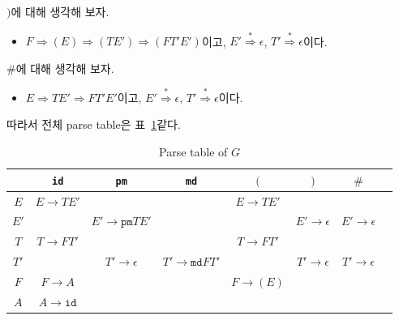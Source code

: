 \documentclass[a4paper,10pt]{scrartcl}
\numberwithin{equation}{section}
\numberwithin{figure}{section}
\numberwithin{table}{section}
\theoremstyle{definition}
\newcommand{\gen}{\Rightarrow}
\newcommand{\stargen}{\overset{*}{\gen}}
\begin{document}
\begin{enumerate}
\begin{fleqn}
    \item $)$에 대해 생각해 보자.
    \begin{itemize}
      \item $F \gen (E) \gen (TE') \gen (FT'E')$이고, $E' \stargen \epsilon$, $T' \stargen \epsilon$이다.
    \end{itemize}

    \item $\#$에 대해 생각해 보자.
    \begin{itemize}
      \item $E \Rightarrow TE' \Rightarrow FT'E'$이고, $E' \stargen \epsilon$, $T' \stargen \epsilon$이다.
    \end{itemize}
  \end{fleqn}
\end{enumerate}

따라서 전체 parse table은 표~\ref{tbl:parse}\와 같다.
\begin{table}[H]
  \centering
  \caption{Parse table of $G$}\label{tbl:parse}
  \begin{tabular}{ c c c c c c c c }
    \toprule
         & \texttt{id}         & \texttt{pm}             & \texttt{md}             & $($         & $)$               & $\#$              \\
    \midrule
    $E$  & $E \to TE'$         &                         &                         & $E \to TE'$ &                   &                   \\
    $E'$ &                     & $E' \to \texttt{pm}TE'$ &                         &             & $E' \to \epsilon$ & $E' \to \epsilon$ \\
    $T$  & $T \to FT'$         &                         &                         & $T \to FT'$ &                   &                   \\
    $T'$ &                     & $T' \to \epsilon$       & $T' \to \texttt{md}FT'$ &             & $T' \to \epsilon$ & $T' \to \epsilon$ \\
    $F$  & $F \to A$           &                         &                         & $F \to (E)$ &                   &                   \\
    $A$  & $A \to \texttt{id}$ &                         &                         &             &                   &                   \\
    \bottomrule
  \end{tabular}
\end{table}

\pagebreak
\end{document}
